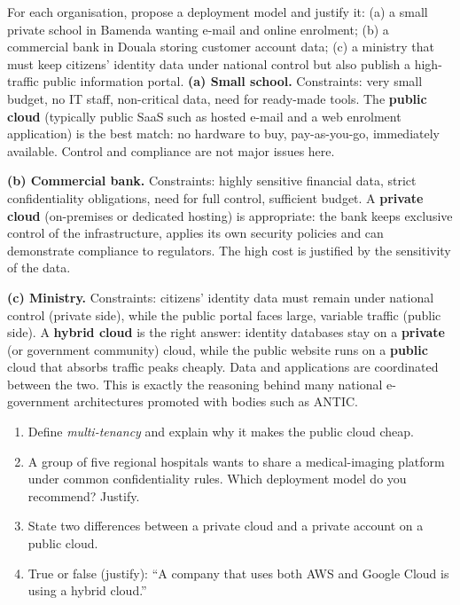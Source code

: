 \documentclass[11pt]{article}
\begin{document}
\begin{exoresolu}
For each organisation, propose a deployment model and justify it: (a) a small private school in Bamenda wanting e-mail and online enrolment; (b) a commercial bank in Douala storing customer account data; (c) a ministry that must keep citizens' identity data under national control but also publish a high-traffic public information portal.
\tcblower
\textbf{(a) Small school.} Constraints: very small budget, no IT staff, non-critical data, need for ready-made tools. The \textbf{public cloud} (typically public SaaS such as hosted e-mail and a web enrolment application) is the best match: no hardware to buy, pay-as-you-go, immediately available. Control and compliance are not major issues here.

\textbf{(b) Commercial bank.} Constraints: highly sensitive financial data, strict confidentiality obligations, need for full control, sufficient budget. A \textbf{private cloud} (on-premises or dedicated hosting) is appropriate: the bank keeps exclusive control of the infrastructure, applies its own security policies and can demonstrate compliance to regulators. The high cost is justified by the sensitivity of the data.

\textbf{(c) Ministry.} Constraints: citizens' identity data must remain under national control (private side), while the public portal faces large, variable traffic (public side). A \textbf{hybrid cloud} is the right answer: identity databases stay on a \textbf{private} (or government community) cloud, while the public website runs on a \textbf{public} cloud that absorbs traffic peaks cheaply. Data and applications are coordinated between the two. This is exactly the reasoning behind many national e-government architectures promoted with bodies such as ANTIC.
\end{exoresolu}

\begin{exercice}
\begin{enumerate}
\item Define \emph{multi-tenancy} and explain why it makes the public cloud cheap.
\item A group of five regional hospitals wants to share a medical-imaging platform under common confidentiality rules. Which deployment model do you recommend? Justify.
\item State two differences between a private cloud and a private account on a public cloud.
\item True or false (justify): ``A company that uses both AWS and Google Cloud is using a hybrid cloud.''
\end{enumerate}
\end{exercice}
\end{document}
